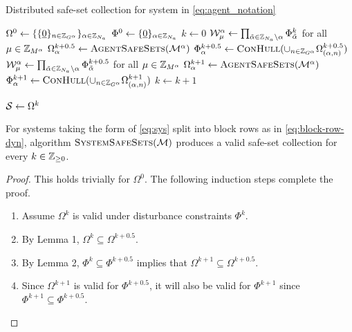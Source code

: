 \begin{algorithm}[t]
\caption{Distributed safe-set collection for system in \autoref{eq:agent_notation}}\label{alg:safe_sets}
\begin{algorithmic}[1]
\State $\Omega^0\gets\{\{\underline{0}\}_{n\in\idxset{\gnumnodes[\agentidx]}}\}_{\agentidx\in\idxset{\numagents}}$
\State $\Phi^0\gets\{\underline{0}\}_{\alpha\in\mathbb{Z}_{{N_a}}}$
\State $k\gets0$
\Repeat
	\ParFor{$\agentidx\in\idxset{\numagents}$}
		\State $\wcon[\modeidx]^\agentidx\gets\prod_{\tilde{\agentidx}\in\idxset{\numagents}\setminus \agentidx}\Phi^{k}_{\tilde\agentidx}$ for all $\modeidx\in\idxset{\nummodes[\agentidx]}$
		\State $\Omega^{k+0.5}_{\agentidx}\gets\Call{AgentSafeSets}{\modes[\agentidx]}$
		\State $\Phi^{k+0.5}_{\agentidx}\gets\Call{ConHull}{\cup_{n\in\idxset{\gnumnodes[{\agentidx}]}}\Omega^{k+0.5}_{({\agentidx},n)}}$
	\EndParFor
	\ParFor{$\agentidx\in\idxset{\numagents}$}
		\State $\wcon[\modeidx]^\agentidx\gets\prod_{\tilde{\agentidx}\in\idxset{\numagents}\setminus \agentidx}\Phi^{k+0.5}_{\tilde\agentidx}$ for all $\modeidx\in\idxset{\nummodes[\agentidx]}$
		\State $\Omega^{k+1}_{\agentidx}\gets\Call{AgentSafeSets}{\modes[\agentidx]}$
		\State $\Phi^{k+1}_{\agentidx}\gets\Call{ConHull}{\cup_{n\in\idxset{\gnumnodes[{\agentidx}]}}\Omega^{k+1}_{({\agentidx},n)}}$
	\EndParFor
	\State $k\gets k+1$

\State $\mathcal{S}\gets\Omega^k$
\EndProcedure
\end{algorithmic}
\end{algorithm}
\begin{lemma}
For systems taking the form of \ref{eq:sys} split into block rows as in \autoref{eq:block-row-dyn}, algorithm $\Call{SystemSafeSets}{\agents}$ produces a valid safe-set collection for every $k\in\mathbb{Z}_{\geq 0}$. 
\end{lemma}
\begin{proof}
This holds trivially for $\Omega^0$. The following induction steps complete the proof.
\begin{enumerate}
	\item Assume $\Omega^k$ is valid under disturbance constraints $\Phi^k$.
	\item By Lemma 1, $\Omega^k\subseteq\Omega^{k+0.5}$.
	\item By Lemma 2, $\Phi^k\subseteq\Phi^{k+0.5}$ implies that $\Omega^{k+1}\subseteq\Omega^{k+0.5}$.
	\item Since $\Omega^{k+1}$ is valid for $\Phi^{k+0.5}$, it will also be valid for $\Phi^{k+1}$ since $\Phi^{k+1}\subseteq\Phi^{k+0.5}$.
\end{enumerate}
\end{proof}